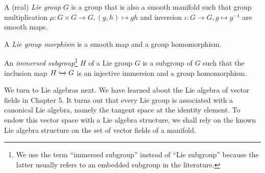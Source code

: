\documentclass[12pt,class=article,crop=false]{standalone}
\begin{document}
\begin{defn}
A (real) \emph{Lie group} $ G$ is a group that is also a smooth manifold such that group multiplication $ \mu: G \times G \to G, (g,h) \mapsto gh$ and inversion $ \iota: G \to G, g \mapsto g^{-1}$ are smooth maps.
\end{defn}
\begin{defn}
A \emph{Lie group morphism} is a smooth map and a group homomorphism. 
\end{defn}
\begin{defn}
	An \emph{immersed subgroup}\footnote{We use the term ``immersed subgroup'' instead of ``Lie subgroup'' because the latter usually refers to an embedded subgroup in the literature.} $ H$ of a Lie group $ G$ is a subgroup of  $ G$ such that the inclusion map $ H \xhookrightarrow{ } G $ is an injective immersion and a group homomorphism.

\end{defn}

We turn to Lie algebras next. We have learned about the Lie algebra of vector fields in Chapter 5. It turns out that every Lie group is associated with a canonical Lie algebra, namely the tangent space at the identity element. To endow this vector space with a Lie algebra structure, we shall rely on the known Lie algebra structure on the set of vector fields of a manifold.
 
\end{document}
